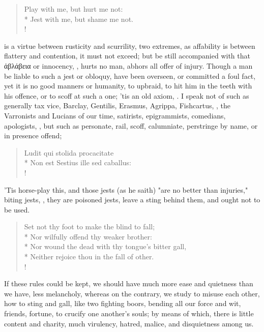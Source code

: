 \begin{verse}%
Play with me, but hurt me not:\\*
Jest with me, but shame me not.\\!
\end{verse}%

 is a virtue between rusticity and scurrility, two extremes, as
affability is between flattery and contention, it must not exceed; but be still
accompanied with that \textgreek{ἀβλάβεια} or innocency,
, hurts no man,
abhors all offer of injury. Though a man be liable to such a jest or obloquy,
have been overseen, or committed a foul fact, yet it is no good manners or
humanity, to upbraid, to hit him in the teeth with his offence, or to scoff at
such a one; 'tis an old axiom, . I speak not of such as generally tax vice,
Barclay, Gentilis, Erasmus, Agrippa, Fishcartus, \etc{}, the Varronists and
Lucians of our time, satirists, epigrammists, comedians, apologists, \etc{},
but such as personate, rail, scoff, calumniate, perstringe by name, or in
presence offend;

\begin{latin}
\begin{verse}%
Ludit qui stolida procacitate\\*
Non est Sestius ille sed caballus:\\!
\end{verse}%
\end{latin}

'Tis horse-play this, and those jests (as he saith) "are
no better than injuries," biting jests, , they are
poisoned jests, leave a sting behind them, and ought not to be used.

\begin{verse}%
Set not thy foot to make the blind to fall;\\*
Nor wilfully offend thy weaker brother:\\*
Nor wound the dead with thy tongue's bitter gall,\\*
Neither rejoice thou in the fall of other.\\!
\end{verse}%

If these rules could be kept, we should have much more ease and quietness than
we have, less melancholy, whereas on the contrary, we study to misuse each
other, how to sting and gall, like two fighting boors, bending all our force
and wit, friends, fortune, to crucify one another's souls;
by means of which, there is little content and charity, much virulency, hatred,
malice, and disquietness among us.

